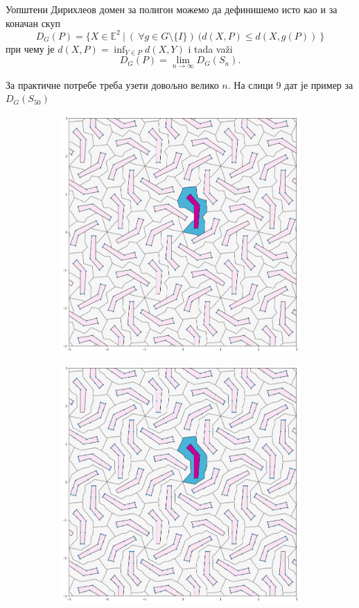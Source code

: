 \documentclass[12pt]{report}
\begin{document}
Уопштени Дирихлеов домен за полигон можемо да дефинишемо исто као и за коначан скуп
$$D_G(P) = \{X \in \mathbb{E}^2\:|\:(\:\forall g \in G \setminus \{I\})\:(d(X,P)\leq d(X,g(P))\:\}$$
при чему је $d(X,P) = \inf_{Y \in P} d(X,Y)$ i tada va\v zi
$$ D_G(P) = \lim _{n\to \infty} D_G(S_n). $$


За практичне потребе треба узети довољно велико $n$. На слици 9 дат је пример за $D_G(S_{50})$

  \begin{figure}[H]
  \begin{subfigure}[b]{0.32\textwidth}
    \includegraphics[width=.9\textwidth]{poligon1.png}
    \label{fig:f7}
  \end{subfigure}
  \begin{subfigure}[b]{0.32\textwidth}
    \includegraphics[width=.9\textwidth]{poligon2.png}

\end{subfigure}
\end{figure}
\end{document}
